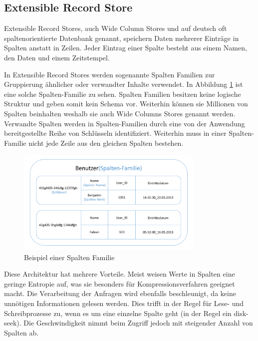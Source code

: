 \subsection{Extensible Record Store}
\label{ch:grundlagen:sec:NoSQL:ExtensibleRecordStore}

Extensible Record Stores, auch Wide Column Stores und auf deutsch oft spaltenorientierte Datenbank genannt, speichern Daten mehrerer Einträge in Spalten anstatt in Zeilen. Jeder Eintrag einer Spalte besteht aus einem Namen, den Daten und einem Zeitstempel.

In Extensible Record Stores werden sogenannte Spalten Familien zur Gruppierung ähnlicher oder verwandter Inhalte verwendet. In Abbildung \ref{wide_column_store} ist eine solche Spalten-Familie zu sehen. Spalten Familien besitzen keine logische Struktur und geben somit kein Schema vor. Weiterhin können sie Millionen von Spalten beinhalten weshalb sie auch Wide Columns Stores genannt werden. Verwandte Spalten werden in Spalten-Familien durch eine von der Anwendung bereitgestellte Reihe von Schlüsseln identifiziert. Weiterhin muss in einer Spalten-Familie nicht jede Zeile aus den gleichen Spalten bestehen.

\begin{figure}[H]
	\centering
  \includegraphics[width=0.8\textwidth, width=0.8\textwidth]{pics/wide_column_stores.pdf}
	\caption{Beispiel einer Spalten Familie}
	\label{wide_column_store}
\end{figure}

Diese Architektur hat mehrere Vorteile. Meist weisen Werte in Spalten eine geringe Entropie auf, was sie besonders für Kompressionsverfahren geeignet macht. Die Verarbeitung der Anfragen wird ebenfalls beschleunigt, da keine unnötigen Informationen gelesen werden. Dies trifft in der Regel für Lese- und Schreibprozesse zu, wenn es um eine einzelne Spalte geht (in der Regel ein disk-seek). Die Geschwindigkeit nimmt beim Zugriff jedoch mit steigender Anzahl von Spalten ab.

